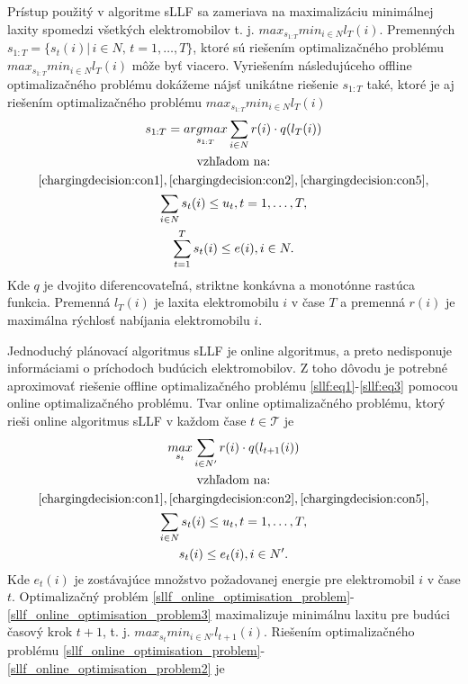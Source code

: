  
 Prístup použitý v algoritme sLLF sa zameriava na maximalizáciu minimálnej laxity spomedzi všetkých elektromobilov t. j. $ max_{s_{1:T}} min_{i \in N}l_{T}(i)$. Premenných $s_{1:T} = \{s_{t}(i) | \, i \in N, \, t = 1,\dots, T\}$, ktoré sú riešením optimalizačného problému $ max_{s_{1:T}}min_{i \in N}l_{T}(i)$ môže byť viacero. Vyriešením následujúceho offline optimalizačného problému dokážeme nájsť unikátne riešenie $s_{1:T}$ také, ktoré je aj riešením optimalizačného problému $max_{s_{1:T}} min_{i \in N}l_{T}(i)$
 \begin{gather}
     \label{sllf:eq1}
 s_{1:T} = \underset{s_{1:T}}{arg max} \sum_{i \in N} r(i) \cdot q(l_{T}(i)) \\
 \notag
 \text{vzhľadom na:} \\
 \notag
 \eqref{chargingdecision:con1}, \eqref{chargingdecision:con2}, \eqref{chargingdecision:con5}, \\
 \label{sllf:eq2}
 \sum_{i \in N} s_{t}(i) \leq u_{t}, t = 1, \dots, T, \\
 \label{sllf:eq3}
 \sum_{t=1}^{T} s_{t}(i) \leq e(i), i  \in N. 
 \end{gather}
 Kde $q$ je dvojito diferencovateľná, striktne konkávna a monotónne rastúca funkcia. Premenná $l_{T}(i)$ je laxita elektromobilu $i$ v čase $T$ a premenná $r(i)$ je maximálna rýchlosť nabíjania elektromobilu $i$.
 
 
 
 Jednoduchý plánovací algoritmus sLLF je online algoritmus, a preto nedisponuje informáciami o príchodoch budúcich elektromobilov. Z toho dôvodu je potrebné aproximovať riešenie offline optimalizačného problému \eqref{sllf:eq1}-\eqref{sllf:eq3} pomocou online optimalizačného problému. Tvar online optimalizačného problému, ktorý rieši online algoritmus sLLF v každom čase $t \in \mathcal{T}$ je
 \begin{gather}
    \label{sllf_online_optimisation_problem} 
    \underset{s_{t}}{max} \sum_{i \in N'} r(i) \cdot q(l_{t + 1}(i)) \\
     \notag
     \text{vzhľadom na:} \\
     \notag
     \eqref{chargingdecision:con1}, \eqref{chargingdecision:con2}, \eqref{chargingdecision:con5}, \\
     \label{sllf_online_optimisation_problem2} 
     \sum_{i \in N} s_{t}(i) \leq u_{t}, t = 1, \dots, T, \\
     \label{sllf_online_optimisation_problem3} 
     s_{t}(i) \leq e_{t}(i), i \in N'.
 \end{gather}
 Kde $e_{t}(i)$ je zostávajúce množstvo požadovanej energie pre elektromobil $i$ v čase $t$. 
 Optimalizačný problém \eqref{sllf_online_optimisation_problem}-\eqref{sllf_online_optimisation_problem3} maximalizuje minimálnu laxitu pre budúci časový krok $t + 1$, t. j. $max_{s_{t}} min_{i \in N'}l_{t + 1}(i)$. Riešením optimalizačného problému \eqref{sllf_online_optimisation_problem}-\eqref{sllf_online_optimisation_problem2} je 

